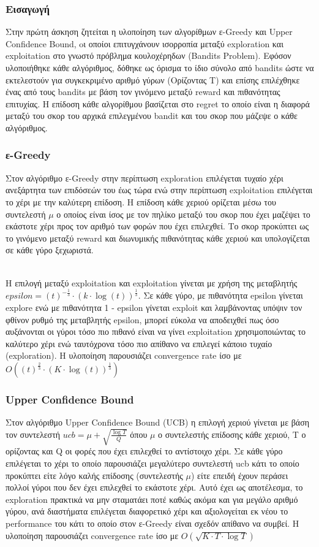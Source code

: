 \subsubsection*{Εισαγωγή}
Στην πρώτη άσκηση ζητείται η υλοποίηση των αλγορίθμων ε-Greedy και Upper Confidence Bound, oι οποίοι επιτυγχάνουν ισορροπία μεταξύ exploration και exploitation στο γνωστό πρόβλημα κουλοχέρηδων (Bandits Problem). Εφόσον υλοποιήθηκε κάθε αλγόριθμος, δόθηκε ως όρισμα το ίδιο σύνολο από bandits ώστε να εκτελεστούν για συγκεκριμένο αριθμό γύρων (Ορίζοντας Τ) και επίσης επιλέχθηκε ένας από τους bandits με βάση τον γινόμενο μεταξύ reward και πιθανότητας επιτυχίας. Η επίδοση κάθε αλγορίθμου βασίζεται στο regret το οποίο είναι η διαφορά μεταξύ του σκορ του αρχικά επιλεγμένου bandit και του σκορ που μάζεψε ο κάθε αλγόριθμος.  

\subsubsection*{ε-Greedy}
Στον αλγόριθμο ε-Greedy στην περίπτωση exploration επιλέγεται τυχαίο χέρι ανεξάρτητα των επιδόσεών του έως τώρα ενώ στην περίπτωση exploitation επιλέγεται το χέρι με την καλύτερη επίδοση. Η επίδοση κάθε χεριού ορίζεται μέσω του συντελεστή $\mu$ ο οποίος είναι ίσος με τον πηλίκο μεταξύ του σκορ που έχει μαζέψει το εκάστοτε χέρι προς τον αριθμό των φορών που έχει επιλεχθεί. Το σκορ προκύπτει ως το γινόμενο μεταξύ reward και διωνυμικής πιθανότητας κάθε χεριού και υπολογίζεται σε κάθε γύρο ξεχωριστά. 

\noindent\\
Η επιλογή μεταξύ exploitation και exploitation γίνεται με χρήση της μεταβλητής $ epsilon = (t)^{-\frac{1}{3}} \cdot (k \cdot \log(t))^{\frac{1}{3}}$. Σε κάθε γύρο, με πιθανότητα epsilon γίνεται explore ενώ με πιθανότητα 1 - epsilon γίνεται exploit και λαμβάνοντας υπόψιν τον φθίνον ρυθμό της μεταβλητής epsilon, μπορεί εύκολα να αποδειχθεί πως όσο αυξάνονται οι γύροι τόσο πιο πιθανό είναι να γίνει exploitation χρησιμοποιώντας το καλύτερο χέρι ενώ ταυτόχρονα τόσο πιο απίθανο να επιλεγεί κάποιο τυχαίο (exploration). Η υλοποίηση παρουσιάζει convergence rate ίσο με $O\left( (t)^{\frac{2}{3}} \cdot (K \cdot \log(t))^{\frac{1}{3}} \right)$


\subsubsection*{Upper Confidence Bound}
\noindent
Στον αλγόριθμο Upper Confidence Bound (UCB) η επιλογή χεριού γίνεται με βάση τον συντελεστή $ucb = \mu + \sqrt{\frac{\log T}{Q}}$
όπου $\mu$ ο συντελεστής επίδοσης κάθε χεριού, Τ ο ορίζοντας και Q οι φορές που έχει επιλεχθεί το αντίστοιχο χέρι. Σε κάθε γύρο επιλέγεται το χέρι το οποίο παρουσιάζει μεγαλύτερο συντελεστή ucb κάτι το οποίο προκύπτει είτε λόγο καλής επίδοσης (συντελεστής $\mu$) είτε επειδή έχουν περάσει πολλοί γύροι που δεν έχει επιλεχθεί το εκάστοτε χέρι. Αυτό έχει ως αποτέλεσμα, το exploration πρακτικά να μην σταματάει ποτέ καθώς ακόμα και για μεγάλο αριθμό γύρου, ανά διαστήματα επιλέγεται διαφορετικό χέρι και αξιολογείται εκ νέου το performance του κάτι το οποίο στον ε-Greedy είναι σχεδόν απίθανο να συμβεί.  Η υλοποίηση παρουσιάζει convergence rate ίσο με $ O\left( \sqrt{K \cdot T \cdot \log T}\right)$



